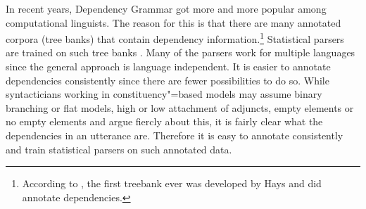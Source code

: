 




%




In recent years, Dependency Grammar got more and more popular among computational linguists. The
reason for this is that there are many annotated corpora (tree banks) that contain dependency
information.\footnote{
  According to \citet{Kay2000a-u}, the first treebank ever was developed by Hays and did
  annotate dependencies.
} Statistical parsers are trained on such tree banks \citep{YM2003a-u,Attardi2006a-u,Nivre2003a-u,KMcDN2009a-u,Bohnet2010a-u}. Many of
the parsers work for multiple languages since the general approach is language independent. It is
easier to annotate dependencies consistently since there are fewer possibilities to do
so.
While
syntacticians working in constituency"=based models may assume binary branching or flat models, high
or low attachment of adjuncts, empty elements or no empty elements and argue fiercly about this,
it is fairly clear what the dependencies in an utterance are. Therefore it is easy to annotate
consistently and train statistical parsers on such annotated data.



